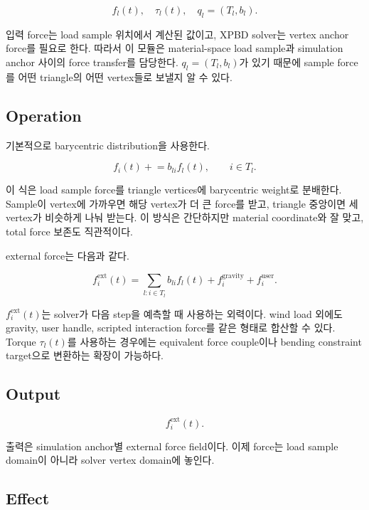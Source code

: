 \documentclass[11pt,a4paper]{article}
\begin{document}
\begin{equation}
f_l(t),\quad \tau_l(t),\quad q_l=(T_l,b_l).
\end{equation}

입력 force는 load sample 위치에서 계산된 값이고, XPBD solver는 vertex anchor force를 필요로 한다.
따라서 이 모듈은 material-space load sample과 simulation anchor 사이의 force transfer를 담당한다.
$q_l=(T_l,b_l)$가 있기 때문에 sample force를 어떤 triangle의 어떤 vertex들로 보낼지 알 수 있다.

\subsection*{Operation}

기본적으로 barycentric distribution을 사용한다.

\begin{equation}
f_i(t)\mathrel{+}=b_{li}f_l(t),\qquad i\in T_l.
\end{equation}

이 식은 load sample force를 triangle vertices에 barycentric weight로 분배한다.
Sample이 vertex에 가까우면 해당 vertex가 더 큰 force를 받고, triangle 중앙이면 세 vertex가 비슷하게 나눠 받는다.
이 방식은 간단하지만 material coordinate와 잘 맞고, total force 보존도 직관적이다.

external force는 다음과 같다.

\begin{equation}
f_i^{\mathrm{ext}}(t)=\sum_{l:i\in T_l}b_{li}f_l(t)+f_i^{\mathrm{gravity}}+f_i^{\mathrm{user}}.
\end{equation}

$f_i^{\mathrm{ext}}(t)$는 solver가 다음 step을 예측할 때 사용하는 외력이다.
wind load 외에도 gravity, user handle, scripted interaction force를 같은 형태로 합산할 수 있다.
Torque $\tau_l(t)$를 사용하는 경우에는 equivalent force couple이나 bending constraint target으로 변환하는 확장이 가능하다.

\subsection*{Output}

\begin{equation}
f_i^{\mathrm{ext}}(t).
\end{equation}

출력은 simulation anchor별 external force field이다.
이제 force는 load sample domain이 아니라 solver vertex domain에 놓인다.

\subsection*{Effect}
\end{document}
